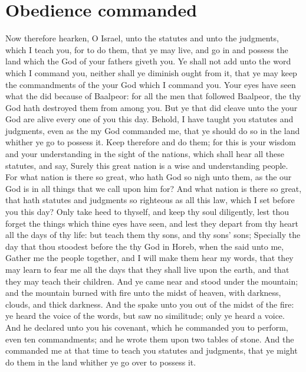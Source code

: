 \section*{Obedience commanded}
\begin{biblechapter} %
\verse Now therefore hearken, O Israel, unto the statutes and unto the judgments, which I teach you, for to do them, that ye may live, and go in and possess the land which the \LORD God of your fathers giveth you.
\verse Ye shall not add unto the word which I command you, neither shall ye diminish ought from it, that ye may keep the commandments of the \LORD your God which I command you.
\verse Your eyes have seen what the \LORD did because of Baalpeor: for all the men that followed Baalpeor, the \LORD thy God hath destroyed them from among you.
\verse But ye that did cleave unto the \LORD your God are alive every one of you this day.
\verse Behold, I have taught you statutes and judgments, even as the \LORD my God commanded me, that ye should do so in the land whither ye go to possess it.
\verse Keep therefore and do them; for this is your wisdom and your understanding in the sight of the nations, which shall hear all these statutes, and say, Surely this great nation is a wise and understanding people.
\verse For what nation is there so great, who hath God so nigh unto them, as the \LORD our God is in all things that we call upon him for?
\verse And what nation is there so great, that hath statutes and judgments so righteous as all this law, which I set before you this day?
\verse Only take heed to thyself, and keep thy soul diligently, lest thou forget the things which thine eyes have seen, and lest they depart from thy heart all the days of thy life: but teach them thy sons, and thy sons' sons;
\verse Specially the day that thou stoodest before the \LORD thy God in Horeb, when the \LORD said unto me, Gather me the people together, and I will make them hear my words, that they may learn to fear me all the days that they shall live upon the earth, and that they may teach their children.
\verse And ye came near and stood under the mountain; and the mountain burned with fire unto the midst of heaven, with darkness, clouds, and thick darkness.
\verse And the \LORD spake unto you out of the midst of the fire: ye heard the voice of the words, but saw no similitude; only ye heard a voice.
\verse And he declared unto you his covenant, which he commanded you to perform, even ten commandments; and he wrote them upon two tables of stone.
\verse And the \LORD commanded me at that time to teach you statutes and judgments, that ye might do them in the land whither ye go over to possess it.

\end{biblechapter}

